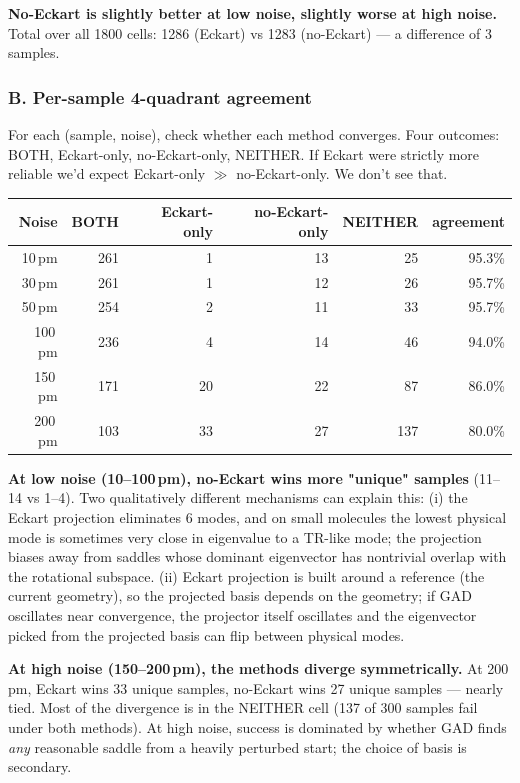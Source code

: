 \documentclass[11pt]{article}
\begin{document}
\textbf{No-Eckart is slightly better at low noise, slightly worse at high noise.}
Total over all 1800 cells: 1286 (Eckart) vs 1283 (no-Eckart) — a difference
of 3 samples.

\subsubsection*{B. Per-sample 4-quadrant agreement}

For each (sample, noise), check whether each method converges. Four
outcomes: BOTH, Eckart-only, no-Eckart-only, NEITHER. If Eckart were
strictly more reliable we'd expect Eckart-only $\gg$ no-Eckart-only. We
don't see that.

\begin{center}
\begin{tabular}{rrrrrr}
\toprule
Noise & BOTH & Eckart-only & no-Eckart-only & NEITHER & agreement \\
\midrule
10\,pm  & 261 & 1  & 13 & 25  & 95.3\% \\
30\,pm  & 261 & 1  & 12 & 26  & 95.7\% \\
50\,pm  & 254 & 2  & 11 & 33  & 95.7\% \\
100\,pm & 236 & 4  & 14 & 46  & 94.0\% \\
150\,pm & 171 & 20 & 22 & 87  & 86.0\% \\
200\,pm & 103 & 33 & 27 & 137 & 80.0\% \\
\bottomrule
\end{tabular}
\end{center}

\textbf{At low noise (10--100\,pm), no-Eckart wins more "unique" samples}
(11--14 vs 1--4). Two qualitatively different mechanisms can explain this:
(i) the Eckart projection eliminates 6 modes, and on small molecules
the lowest physical mode is sometimes very close in eigenvalue to a
TR-like mode; the projection biases away from saddles whose dominant
eigenvector has nontrivial overlap with the rotational subspace.
(ii) Eckart projection is built around a reference (the current
geometry), so the projected basis depends on the geometry; if GAD
oscillates near convergence, the projector itself oscillates and the
eigenvector picked from the projected basis can flip between physical
modes.

\textbf{At high noise (150--200\,pm), the methods diverge symmetrically.}
At 200\,pm, Eckart wins 33 unique samples, no-Eckart wins 27 unique
samples --- nearly tied. Most of the divergence is in the NEITHER cell
(137 of 300 samples fail under both methods). At high noise, success
is dominated by whether GAD finds \emph{any} reasonable saddle from a
heavily perturbed start; the choice of basis is secondary.
\end{document}
